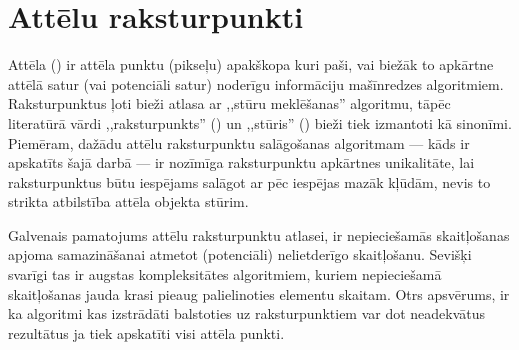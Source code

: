\section{Attēlu raksturpunkti} \label{sec:algo}
Attēla  () ir attēla punktu (pikseļu)
apakškopa kuri paši, vai biežāk to apkārtne attēlā 
satur (vai potenciāli satur) noderīgu informāciju mašīnredzes algoritmiem.
Raksturpunktus ļoti bieži atlasa ar ,,stūru meklēšanas'' algoritmu,
tāpēc literatūrā vārdi ,,raksturpunkts'' () un ,,stūris''
() bieži tiek izmantoti kā sinonīmi. Piemēram, dažādu attēlu
raksturpunktu salāgošanas algoritmam --- kāds ir apskatīts šajā darbā ---
ir nozīmīga raksturpunktu apkārtnes unikalitāte,
lai raksturpunktus būtu iespējams salāgot ar pēc iespējas mazāk kļūdām,
nevis to strikta atbilstība attēla objekta stūrim.

Galvenais pamatojums attēlu raksturpunktu atlasei, ir nepieciešamās
skaitļošanas apjoma samazināšanai atmetot (potenciāli) nelietderīgo
skaitļošanu. Sevišķi svarīgi tas ir augstas kompleksitātes algoritmiem,
kuriem nepieciešamā skaitļošanas jauda krasi pieaug palielinoties
elementu skaitam. Otrs apsvērums, ir ka algoritmi kas izstrādāti balstoties
uz raksturpunktiem var dot neadekvātus rezultātus ja tiek apskatīti visi
attēla punkti.


